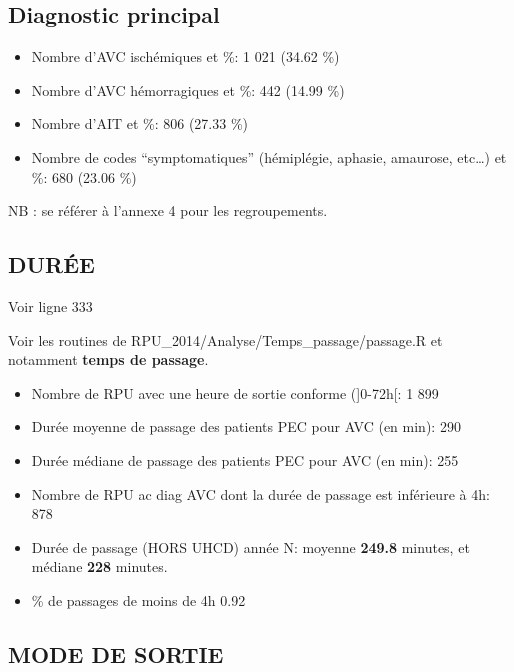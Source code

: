 \documentclass[]{article}
\begin{document}
\subsection{Diagnostic principal}\label{diagnostic-principal-1}

\begin{itemize}
\itemsep1pt\parskip0pt
\item
  Nombre d'AVC ischémiques et \%: 1 021 (34.62 \%)
\item
  Nombre d'AVC hémorragiques et \%: 442 (14.99 \%)
\item
  Nombre d'AIT et \%: 806 (27.33 \%)
\item
  Nombre de codes ``symptomatiques'' (hémiplégie, aphasie, amaurose,
  etc\ldots{}) et \%: 680 (23.06 \%)
\end{itemize}

NB : se référer à l'annexe 4 pour les regroupements.

\subsection{DURÉE}\label{duree-1}

Voir ligne 333

Voir les routines de RPU\_2014/Analyse/Temps\_passage/passage.R et
notamment \textbf{temps de passage}.

\begin{itemize}
\item
  Nombre de RPU avec une heure de sortie conforme ({]}0-72h{[}: 1 899
\item
  Durée moyenne de passage des patients PEC pour AVC (en min): 290
\item
  Durée médiane de passage des patients PEC pour AVC (en min): 255
\item
  Nombre de RPU ac diag AVC dont la durée de passage est inférieure à
  4h: 878
\item
  Durée de passage (HORS UHCD) année N: moyenne \textbf{249.8} minutes,
  et médiane \textbf{228} minutes.
\item
  \% de passages de moins de 4h 0.92
\end{itemize}

\subsection{MODE DE SORTIE}\label{mode-de-sortie-2}
\end{document}
